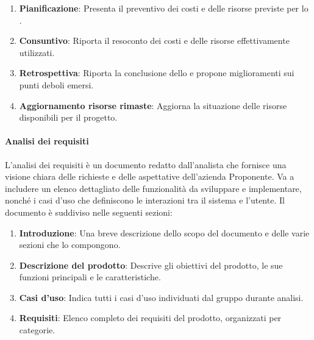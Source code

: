 \begin{itemize}
\begin{enumerate}
        \item \textbf{Pianificazione}: Presenta il preventivo dei costi e delle risorse previste per lo .
        \item \textbf{Consuntivo}: Riporta il resoconto dei costi e delle risorse effettivamente utilizzati.
        \item \textbf{Retrospettiva}: Riporta la conclusione dello  e propone miglioramenti sui punti deboli emersi.
        \item \textbf{Aggiornamento risorse rimaste}: Aggiorna la situazione delle risorse disponibili per il progetto.
    \end{enumerate}
\end{itemize}

\paragraph{Analisi dei requisiti}
L’analisi dei requisiti è un documento redatto dall’analista che fornisce una visione chiara delle richieste e delle aspettative dell’azienda Proponente. Va a includere un elenco dettagliato delle funzionalità da sviluppare e implementare, nonché i casi d’uso che definiscono le interazioni tra il sistema e l’utente.
Il documento è suddiviso nelle seguenti sezioni:
\begin{enumerate}
    \item \textbf{Introduzione}: Una breve descrizione dello scopo del documento e delle varie sezioni che lo compongono.
    \item \textbf{Descrizione del prodotto}: Descrive gli obiettivi del prodotto, le sue funzioni principali e le caratteristiche.
    \item \textbf{Casi d’uso}: Indica tutti i casi d’uso individuati dal gruppo durante analisi.
    \item \textbf{Requisiti}: Elenco completo dei requisiti del prodotto, organizzati per categorie.
\end{enumerate}

